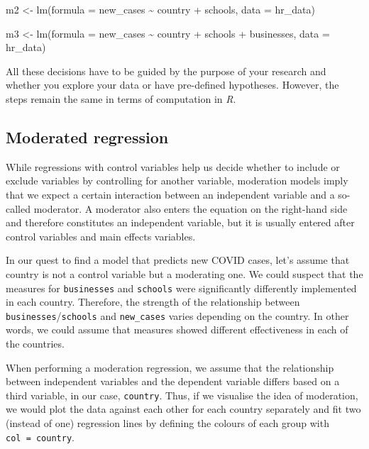 \documentclass[
  letterpaper,
]{krantz}
\begin{document}
m2 \textless- lm(formula = new\_cases \textasciitilde{} country +
schools, data = hr\_data)

m3 \textless- lm(formula = new\_cases \textasciitilde{} country +
schools + businesses, data = hr\_data)

All these decisions have to be guided by the purpose of your research
and whether you explore your data or have pre-defined hypotheses.
However, the steps remain the same in terms of computation in \emph{R}.

\subsection{Moderated regression}\label{sec-moderated-regression}

While regressions with control variables help us decide whether to
include or exclude variables by controlling for another variable,
moderation models imply that we expect a certain interaction between an
independent variable and a so-called moderator. A moderator also enters
the equation on the right-hand side and therefore constitutes an
independent variable, but it is usually entered after control variables
and main effects variables.

In our quest to find a model that predicts new COVID cases, let's assume
that country is not a control variable but a moderating one. We could
suspect that the measures for \texttt{businesses} and \texttt{schools}
were significantly differently implemented in each country. Therefore,
the strength of the relationship between
\texttt{businesses}/\texttt{schools} and \texttt{new\_cases} varies
depending on the country. In other words, we could assume that measures
showed different effectiveness in each of the countries.

When performing a moderation regression, we assume that the relationship
between independent variables and the dependent variable differs based
on a third variable, in our case, \texttt{country}. Thus, if we
visualise the idea of moderation, we would plot the data against each
other for each country separately and fit two (instead of one)
regression lines by defining the colours of each group with
\texttt{col\ =\ country}.
\end{document}

